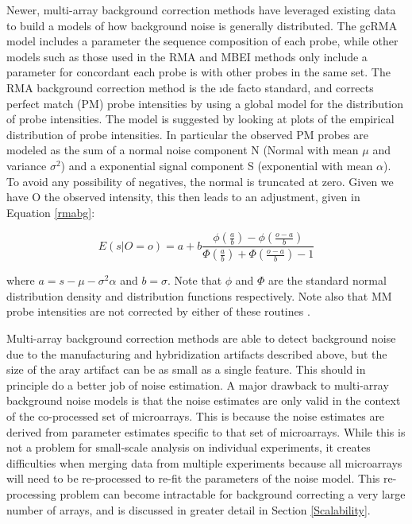 Newer, multi-array background correction methods have leveraged existing data
to build a models of how background noise is generally distributed.  The gcRMA
model \cite{gcrma} includes a parameter the sequence composition of each
probe, while other models such as those used in the RMA and MBEI
\cite{rma,bioc} methods only include a parameter for concordant each probe is
with other probes in the same set.  The RMA background correction method is the
\i{de facto} standard, and corrects perfect match (PM) probe intensities by
using a global model for the distribution of probe intensities. The model is
suggested by looking at plots of the empirical distribution of probe
intensities.  In particular the observed PM probes are modeled as the sum of a
normal noise component N (Normal with mean $\mu$ and variance $\sigma^2$) and a
exponential signal component S (exponential with mean $\alpha$). To avoid any
possibility of negatives, the normal is truncated at zero. Given we have O the
observed intensity, this then leads to an adjustment, given in Equation
\ref{rmabg}:

\begin{equation}
\label{rmabg}
E\left(s \lvert O=o\right) = a + b \frac{\phi\left(\frac{a}{b}\right) - \phi\left(\frac{o-a}{b}\right)}{\Phi\left(\frac{a}{b}\right) + \Phi\left(\frac{o-a}{b}\right) - 1 }
\end{equation}

where $a =  s- \mu - \sigma^2\alpha$ and $b = \sigma$. Note that $\phi$ and
$\Phi$ are the standard normal distribution density and distribution functions
respectively.  Note also that MM probe intensities are not corrected by either
of these routines \cite{rma,bioc}.

Multi-array background correction methods are able to detect background noise
due to the manufacturing and hybridization artifacts described above, but the
size of the aray artifact can be as small as a single feature.  This should in
principle do a better job of noise estimation.  A major drawback to multi-array
background noise models is that the noise estimates are only valid in the
context of the co-processed set of microarrays.  This is because the noise
estimates are derived from parameter estimates specific to that set of
microarrays.  While this is not a problem for small-scale analysis on
individual experiments, it creates difficulties when merging data from multiple
experiments because all microarrays will need to be re-processed to re-fit the
parameters of the noise model.  This re-processing problem can become
intractable for background correcting a very large number of arrays, and is
discussed in greater detail in Section \ref{Scalability}.

